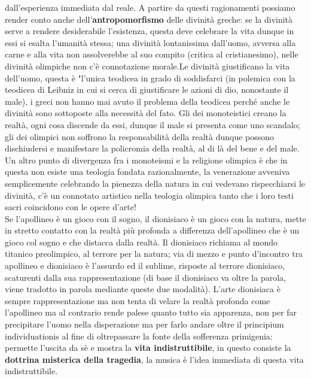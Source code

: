 \documentclass[10pt,a4paper]{article}
\begin{document}
dall'esperienza immediata dal reale. A partire da questi ragionamenti possiamo render conto anche dell'\textbf{antropomorfismo} delle divinità greche: se la divinità serve a rendere desiderabile l'esistenza, questa deve celebrare la vita dunque in essi si esalta l'umanità stessa; una divinità lontanissima dall'uomo, avversa alla carne e alla vita non assolverebbe al suo compito (critica al cristianesimo), nelle divinità olimpiche non c'è connotazione morale.Le divinità giustificano la vita dell'uomo, questa è "l'unica teodicea in grado di soddisfarci (in polemica con la teodicea di Leibniz in cui si cerca di giustificare le azioni di dio, nonostante il male), i greci non hanno mai avuto il problema della teodicea perché anche le divinità sono sottoposte alla necessità del fato. Gli dei monoteistici creano la realtà, ogni cosa discende da essi, dunque il male si presenta come uno scandalo; gli dei olimpici non soffrono la responsabilità della realtà dunque possono dischiudersi e manifestare la policromia della realtà, al di là del bene e del male. Un altro punto di divergenza fra i monoteismi e la religione olimpica è che in questa non esiste una teologia fondata razionalmente, la venerazione avveniva semplicemente celebrando la pienezza della natura in cui vedevano rispecchiarsi le divinità, c'è un connotato artistico nella teologia olimpica tanto che i loro testi sacri coincidono con le opere d'arte!\\
Se l'apollineo è un gioco con il sogno, il dionisiaco è un gioco con la natura, mette in stretto contatto con la realtà più profonda a differenza dell'apollineo che è un gioco col sogno e che distacca dalla realtà. Il dionisiaco richiama al mondo titanico preolimpico, al terrore per la natura; via di mezzo e punto d'incontro tra apollineo e dionisiaco è l'assurdo ed il sublime, risposte al terrore dionisiaco, scaturenti dalla sua rappresentazione (di base il dionisiaco va oltre la parola, viene tradotto in parola mediante queste due modalità). L'arte dionisiaca è sempre rappresentazione ma non tenta di velare la realtà profonda come l'apollineo ma al contrario rende palese quanto tutto sia apparenza, non per far precipitare l'uomo nella disperazione ma per farlo andare oltre il principium individuationis al fine di oltrepassare la fonte della sofferenza primigenia: permette l'uscita da sè e mostra la \textbf{vita indistruttibile}, in questo consiste la \textbf{dottrina misterica della tragedia}, la musica è l'idea immediata di questa vita indistruttibile.\\
\end{document}
